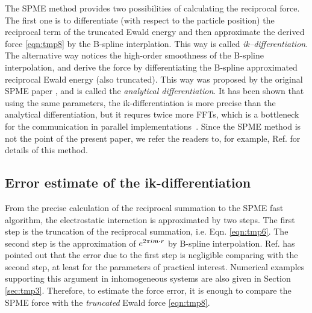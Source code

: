 \documentclass[aps,pre,preprint]{revtex4}
\renewcommand{\v}[1]{\textbf{\textit{#1}}}
\begin{document}
The SPME method provides two possibilities of calculating the
reciprocal force. The first one is to differentiate (with respect to
the particle position) the reciprocal term of the truncated Ewald
energy and then approximate the derived force \eqref{eqn:tmp8} by the
B-spline interplation. This way is called
\emph{ik--differentiation}. The alternative way notices the high-order
smoothness of the B-spline interpolation, and derive the force by
differentiating the B-spline approximated reciprocal Ewald energy
(also truncated). This way was proposed by the original SPME paper
\cite{essmann1995spm}, and is called the \emph{analytical
  differentiation}.  It has been shown that using the same parameters,
the ik-differentiation is more precise than the analytical
differentiation, but it requres twice more FFTs, which is a bottleneck
for the communication in parallel
implementations~\cite{wang2010optimizing}. Since the SPME method is
not the point of the present paper, we refer the readers to, for
example, Ref. \cite{essmann1995spm, deserno1998mue1,
  wang2010optimizing} for details of this method.


\subsection{Error estimate of the ik-differentiation}

From the precise calculation of the reciprocal summation to the SPME
fast algorithm, the electrostatic interaction is approximated by two
steps.  The first step is the truncation of the reciprocal summation,
i.e. Eqn. \eqref{eqn:tmp6}. The second step is the approximation of
$e^{2\pi i\v m\cdot\v r}$ by B-spline
interpolation. Ref. \cite{wang2010optimizing} has pointed out that the
error due to the first step is negligible comparing with the second
step, at least for the parameters of practical interest. Numerical
examples supporting this argument in inhomogeneous systems are also
given in Section \ref{sec:tmp3}.  Therefore, to estimate the force
error, it is enough to compare the SPME force with the
\emph{truncated} Ewald force \eqref{eqn:tmp8}. 
\end{document}
